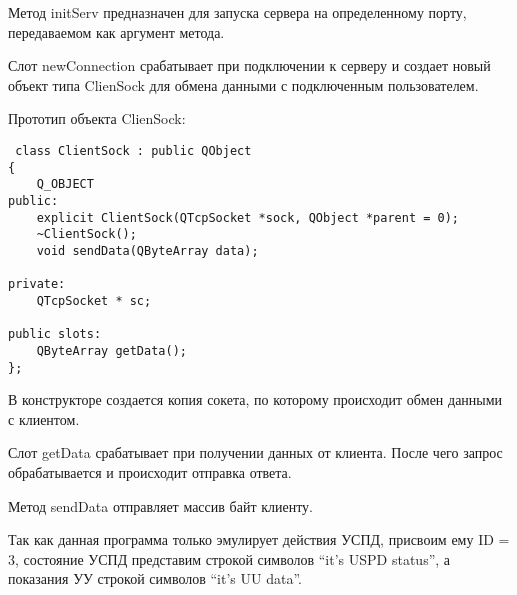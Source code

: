 Метод initServ предназначен для запуска сервера на определенному порту, передаваемом как аргумент метода.

Слот newConnection срабатывает при подключении к серверу и создает новый объект типа ClienSock для обмена данными с подключенным пользователем.

Прототип объекта ClienSock:

\begin{lstlisting}
 class ClientSock : public QObject
{
    Q_OBJECT
public:
    explicit ClientSock(QTcpSocket *sock, QObject *parent = 0);
    ~ClientSock();
    void sendData(QByteArray data);
    
private:
    QTcpSocket * sc;

public slots:
    QByteArray getData();
};
\end{lstlisting}

В конструкторе создается копия сокета, по которому происходит обмен данными с клиентом.

Слот getData срабатывает при получении данных от клиента. После чего запрос обрабатывается и происходит отправка ответа.

Метод sendData отправляет массив байт клиенту.

Так как данная программа только эмулирует действия УСПД, присвоим ему ID = 3, состояние УСПД представим строкой символов ``it's USPD status'', а показания УУ строкой символов ``it's UU data''.

